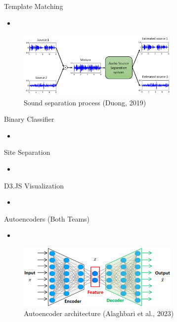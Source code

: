 \begin{frame}{Template Matching}
    \begin{itemize}
        \item 
    \end{itemize}
    \begin{figure}
        \centering
        \includegraphics[height=0.7\textheight,width=0.7\textwidth,keepaspectratio]{images/sound_separation.png}
        \caption{Sound separation process (Duong, 2019)}
    \end{figure}
\end{frame}

\begin{frame}{Binary Classifier}
    \begin{itemize}
        \item 
    \end{itemize}
\end{frame}

\begin{frame}{Site Separation}
    \begin{itemize}
        \item 
    \end{itemize}
\end{frame}

\begin{frame}{D3.JS Visualization}
    \begin{itemize}
        \item 
    \end{itemize}
\end{frame}

\begin{frame}{Autoencoders (Both Teams)}
    \begin{itemize}
        \item 
    \end{itemize}
    \begin{figure}
        \centering
        \includegraphics[height=0.7\textheight,width=0.7\textwidth,keepaspectratio]{images/autoencoder.png}
        \caption{Autoencoder architecture (Alaghbari et al., 2023)}
    \end{figure}
\end{frame}